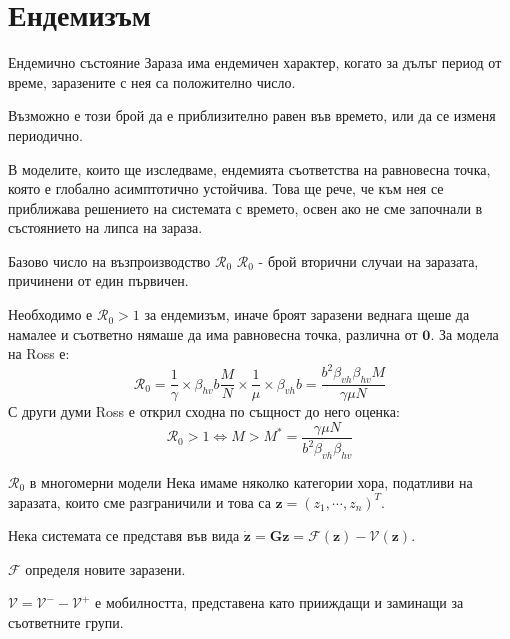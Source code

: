 \section{\hspace{1em}Ендемизъм}
\begin{frame}[t]{Ендемично състояние}
  Зараза има ендемичен характер, когато за дълъг период от време, заразените с нея са положително число.

  Възможно е този брой да е приблизително равен във времето, или да се изменя периодично.

  В моделите, които ще изследваме, ендемията съответства на равновесна точка, която е глобално асимптотично устойчива. Това ще рече, че към нея се приближава решението на системата с времето, освен ако не сме започнали в състоянието на липса на зараза.
\end{frame}

\begin{frame}[t]{Базово число на възпроизводство $\mathscr{R}_0$}
  $\mathscr{R}_0$ - брой вторични случаи на заразата, причинени от един първичен.

  Необходимо е $\mathscr{R}_0 > 1$ за ендемизъм,
  иначе броят заразени веднага щеше да намалее и съответно нямаше да има равновесна точка, различна от $\boldsymbol{0}$. За модела на Ross е:
  \begin{equation}
    \mathscr{R}_0 = \frac{1}{\gamma} \times \beta_{hv} b \frac{M}{N} \times \frac{1}{\mu} \times \beta_{vh} b = \frac{b^2 \beta_{vh} \beta_{hv} M}{\gamma \mu N}
  \end{equation}
  С други думи Ross е открил сходна по същност до него оценка:
  \begin{equation}
    \mathscr{R}_0 > 1 \iff M > M^* = \frac{\gamma \mu N}{b^2 \beta_{vh} \beta_{hv}}
  \end{equation}
\end{frame}

\begin{frame}[t]{$\mathscr{R}_0$ в многомерни модели}
  Нека имаме няколко категории хора, податливи на заразата, които сме разграничили и това са $\boldsymbol{z} = (z_1, \cdots, z_n)^T$.

  Нека системата се представя във вида $\dot{\boldsymbol{z}} = \boldsymbol{G}{\boldsymbol{z}} = \mathscr{F}(\boldsymbol{z}) - \mathscr{V}(\boldsymbol{z})$.

  $\mathscr{F}$ определя новите заразени.

  $\mathscr{V} = \mathscr{V}^- - \mathscr{V}^+$ е мобилността, представена като прииждащи и заминащи за съответните групи.
\end{frame}

